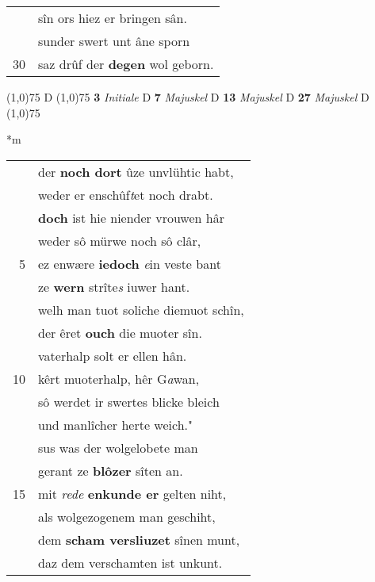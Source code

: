 \documentclass[8pt,a4paper,notitlepage]{article}
\begin{document}
\begin{table}[ht]
\begin{minipage}[t]{0.5\linewidth}
\begin{tabular}{rl}
 & sîn ors hiez er bringen sân.\\ 
 & sunder swert unt âne sporn\\ 
30 & saz drûf der \textbf{degen} wol geborn.\\ 
\end{tabular}
\scriptsize
\line(1,0){75} \newline
D \newline
\line(1,0){75} \newline
\textbf{3} \textit{Initiale} D  \textbf{7} \textit{Majuskel} D  \textbf{13} \textit{Majuskel} D  \textbf{27} \textit{Majuskel} D  \newline
\line(1,0){75} \newline
\newline
\end{minipage}
\hspace{0.5cm}
\begin{minipage}[t]{0.5\linewidth}
\small
\begin{center}*m
\end{center}
\begin{tabular}{rl}
 & der \textbf{noch dort} ûze unvlühtic habt,\\ 
 & weder er enschûf\textit{t}et noch drabt.\\ 
 & \textbf{doch} ist hie niender vrouwen hâr\\ 
 & weder sô mürwe noch sô clâr,\\ 
5 & ez enwære \textbf{iedoch} \textit{e}in veste bant\\ 
 & ze \textbf{wern} strîte\textit{s} iuwer hant.\\ 
 & welh man tuot soliche diemuot schîn,\\ 
 & der êret \textbf{ouch} die muoter sîn.\\ 
 & vaterhalp solt er ellen hân.\\ 
10 & kêrt muoterhalp, hêr G\textit{a}wan,\\ 
 & sô werdet ir swertes blicke bleich\\ 
 & und manlîcher herte weich."\\ 
 & sus was der wolgelobete man\\ 
 & gerant ze \textbf{blôzer} sîten an.\\ 
15 & mit \textit{rede} \textbf{enkunde er} gelten niht,\\ 
 & als wolgezogenem man geschiht,\\ 
 & dem \textbf{scham versliuzet} sînen munt,\\ 
 & daz dem verschamten ist unkunt.\\ 

\end{tabular}
\end{minipage}
\end{table}
\end{document}
